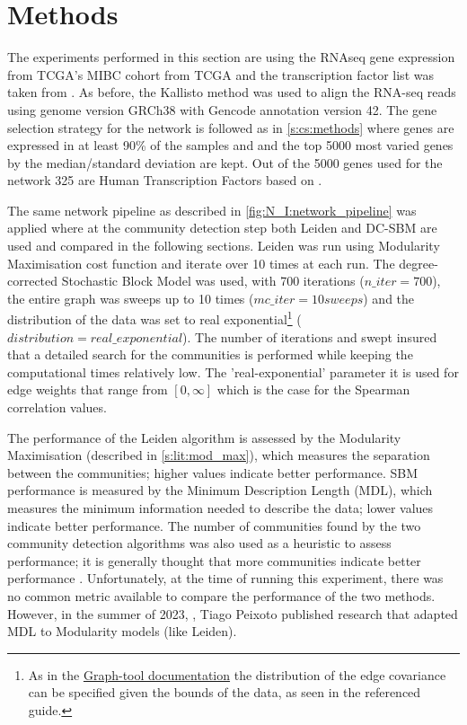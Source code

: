 \section{Methods}

The experiments performed in this section are using the RNAseq gene expression from TCGA's MIBC cohort from TCGA and the transcription factor list was taken from \citet{Lambert2018-el}. As before, the Kallisto method was used to align the RNA-seq reads using genome version GRCh38 with Gencode annotation version 42. The gene selection strategy for the network is followed as in \cref{s:cs:methods} where genes are expressed in at least 90\% of the samples and and the top 5000 most varied genes by the median/standard deviation are kept. Out of the 5000 genes used for the network 325 are Human Transcription Factors based on \citet{Lambert2018-el}.

The same network pipeline as described in \cref{fig:N_I:network_pipeline} was applied where at the community detection step both Leiden and DC-SBM are used and compared in the following sections. Leiden was run using Modularity Maximisation cost function and iterate over 10 times at each run. The degree-corrected Stochastic Block Model was used, with 700 iterations ($n\_iter=700$), the entire graph was sweeps up to 10 times ($mc\_iter = 10 sweeps$) and the distribution of the data was set to real exponential\footnote{As in the \href{https://graph-tool.skewed.de/static/doc/demos/inference/inference.html}{Graph-tool documentation} the distribution of the edge covariance can be specified given the bounds of the data, as seen in the referenced guide.} ($distribution = real\_exponential$). The number of iterations and swept insured that a detailed search for the communities is performed while keeping the computational times relatively low. The 'real-exponential' parameter it is used for edge weights that range from $[0, \infty]$ which is the case for the Spearman correlation values.

The performance of the Leiden algorithm is assessed by the Modularity Maximisation (described in \cref{s:lit:mod_max}), which measures the separation between the communities; higher values indicate better performance. SBM performance is measured by the Minimum Description Length (MDL), which measures the minimum information needed to describe the data; lower values indicate better performance. The number of communities found by the two community detection algorithms was also used as a heuristic to assess performance; it is generally thought that more communities indicate better performance \citep{Care2019-ij}. Unfortunately, at the time of running this experiment, there was no common metric available to compare the performance of the two methods. However, in the summer of 2023, \cite{Peixoto2023-mw}, Tiago Peixoto published research that adapted MDL to Modularity models (like Leiden).


